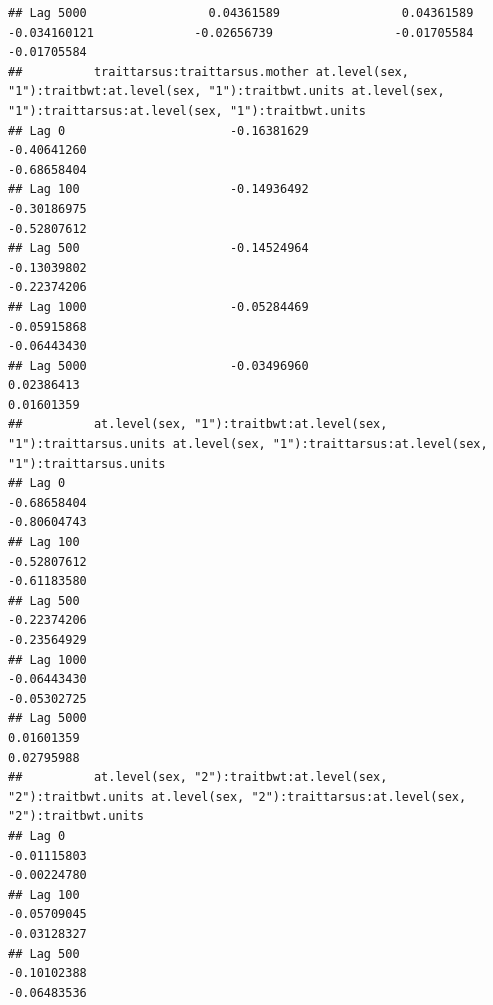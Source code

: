 \documentclass[
  12pt,
]{book}
\begin{document}
\begin{verbatim}
## Lag 5000                 0.04361589                 0.04361589                  -0.034160121              -0.02656739                 -0.01705584                 -0.01705584
##          traittarsus:traittarsus.mother at.level(sex, "1"):traitbwt:at.level(sex, "1"):traitbwt.units at.level(sex, "1"):traittarsus:at.level(sex, "1"):traitbwt.units
## Lag 0                       -0.16381629                                                   -0.40641260                                                      -0.68658404
## Lag 100                     -0.14936492                                                   -0.30186975                                                      -0.52807612
## Lag 500                     -0.14524964                                                   -0.13039802                                                      -0.22374206
## Lag 1000                    -0.05284469                                                   -0.05915868                                                      -0.06443430
## Lag 5000                    -0.03496960                                                    0.02386413                                                       0.01601359
##          at.level(sex, "1"):traitbwt:at.level(sex, "1"):traittarsus.units at.level(sex, "1"):traittarsus:at.level(sex, "1"):traittarsus.units
## Lag 0                                                         -0.68658404                                                         -0.80604743
## Lag 100                                                       -0.52807612                                                         -0.61183580
## Lag 500                                                       -0.22374206                                                         -0.23564929
## Lag 1000                                                      -0.06443430                                                         -0.05302725
## Lag 5000                                                       0.01601359                                                          0.02795988
##          at.level(sex, "2"):traitbwt:at.level(sex, "2"):traitbwt.units at.level(sex, "2"):traittarsus:at.level(sex, "2"):traitbwt.units
## Lag 0                                                      -0.01115803                                                      -0.00224780
## Lag 100                                                    -0.05709045                                                      -0.03128327
## Lag 500                                                    -0.10102388                                                      -0.06483536

\end{verbatim}
\end{document}
